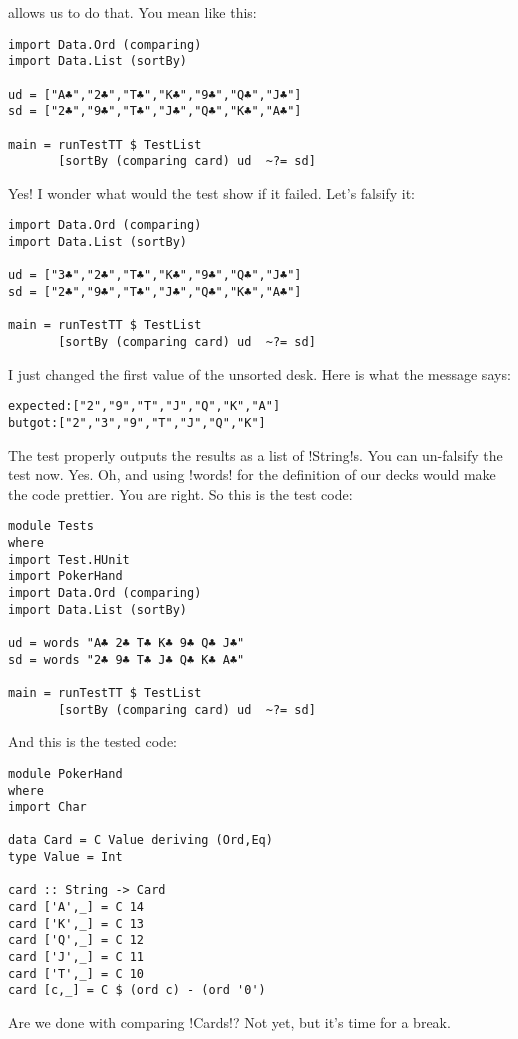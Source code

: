 allows us to do that.
\lhN You mean like this:
\begin{lstlisting}[frame=single]
import Data.Ord (comparing)
import Data.List (sortBy)

ud = ["A♣","2♣","T♣","K♣","9♣","Q♣","J♣"]
sd = ["2♣","9♣","T♣","J♣","Q♣","K♣","A♣"]

main = runTestTT $ TestList 
       [sortBy (comparing card) ud  ~?= sd]
\end{lstlisting} %
\hspace*{\fill}
\lhA \success Yes!
\lhN I wonder what would the test show if it failed. Let's falsify it:
\begin{lstlisting}[frame=single]
import Data.Ord (comparing)
import Data.List (sortBy)

ud = ["3♣","2♣","T♣","K♣","9♣","Q♣","J♣"]
sd = ["2♣","9♣","T♣","J♣","Q♣","K♣","A♣"]

main = runTestTT $ TestList 
       [sortBy (comparing card) ud  ~?= sd]
\end{lstlisting} %
I just changed the first value of the unsorted desk. 
\lhA \failure Here is what the message says:
\begin{small}
\begin{alltt}
expected: ["2\monoclubs","9\monoclubs","T\monoclubs","J\monoclubs","Q\monoclubs","K\monoclubs","A\monoclubs"]
 but got: ["2\monoclubs","3\monoclubs","9\monoclubs","T\monoclubs","J\monoclubs","Q\monoclubs","K\monoclubs"]
\end{alltt}
\end{small}
The test properly outputs the results as a list of \il!String!s. You can un-falsify the test now.
\lhN Yes.
\lhA Oh, and using \il!words! for the definition of our decks would make the code prettier.
\lhN You are right. So this is the test code:
\begin{lstlisting}[frame=single]
module Tests
where 
import Test.HUnit
import PokerHand
import Data.Ord (comparing)
import Data.List (sortBy)

ud = words "A♣ 2♣ T♣ K♣ 9♣ Q♣ J♣"
sd = words "2♣ 9♣ T♣ J♣ Q♣ K♣ A♣"

main = runTestTT $ TestList 
       [sortBy (comparing card) ud  ~?= sd]
\end{lstlisting} %
\hspace*{\fill}
\lhA \success And this is the tested code:
\begin{lstlisting}[frame=single]
module PokerHand
where
import Char

data Card = C Value deriving (Ord,Eq)
type Value = Int

card :: String -> Card
card ['A',_] = C 14
card ['K',_] = C 13
card ['Q',_] = C 12
card ['J',_] = C 11
card ['T',_] = C 10
card [c,_] = C $ (ord c) - (ord '0')
\end{lstlisting} %
\lhN Are we done with comparing \il!Cards!?
\lhA Not yet, but it's time for a break.
\lhend
